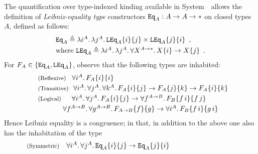The quantification over type-indexed kinding available in System~\Fi\
allows the definition of \emph{Leibniz-equality type} constructors
$\mathtt{Eq}_A: A\to A\to *$ on closed types~$A$, defined as follows:
\[\begin{array}{l}
\mathtt{Eq}_A \triangleq
	\lambda i^A.\, \lambda j^A.\, 
	\mathtt{LEq}_A\{i\} \{j\} \times \mathtt{LEq}_A\{j\} \{i\}
\enspace,
\\[1mm]
\text{where } 
\mathtt{LEq}_A \triangleq
	\lambda i^A.\, \lambda j^A.\, \forall X^{A\to*}.\, X\{i\}\to X\{j\}
\enspace.
\end{array}\]
For $F_A\in\{\mathtt{Eq}_A,\mathtt{LEq}_A\}$, 
observe that the following types are
inhabited: 
\[\!\!\!\!\begin{array}{l}
\text{\small(Reflexive)} 
~~\,
\forall i^A.\,F_A\s{i}\s{i}
\\[1mm]
\text{\small(Transitive)} 
~~
\forall i^A.\,\forall j^A.\,\forall k^A.\,
  F_A\s{i}\s{j}\to F_A\s{j}\s{k}\to F_A\s{i}\s{k}
\\[1mm]
\text{\small(Logical)}
\quad~\, \forall i^A.\,\forall j^A.\, 
F_A\s{i}\s{j}\to \forall f^{A\to B}.\, F_B\s{f\,i}\s{f\,j}
\\[1mm]
\qquad\qquad~~~
\forall f^{A\to B}.\,\forall g^{A\to B}.\, 
F_{A\to B}\s{f}\s{g}\to 
\forall i^A.\, F_B\s{f\,i}\s{g\,i}
\end{array}\]
Hence Leibniz equality is a congruence; in that, in addition to the above
one also has the inhabitation of the type
\[\!\!\!\!\begin{array}{l}
\text{\small(Symmetric)} 
\quad
\forall i^A.\,\forall j^A.\,
  \Eq_A\s{i}\s{j}\to\Eq_A\s{j}\s{i}
\end{array}\qquad\qquad\qquad\qquad\qquad\]

